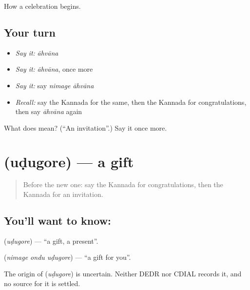 \begin{grammarlens}[title={What you've built}]
How a celebration begins.
\end{grammarlens}

\subsection*{Your turn}
\begin{itemize}
\raggedright
  \item \emph{Say it:} \emph{āhvāna}
  \item \emph{Say it:} \emph{āhvāna}, once more
  \item \emph{Say it:} say \emph{nimage āhvāna}
  \item \emph{Recall:} say the Kannada for the same, then the Kannada for congratulations, then say \emph{āhvāna} again
\end{itemize}

\begin{tcolorbox}[breakable,colback=teal!4,colframe=teal!35!black,title={Before you move on}]
What does  mean? (\textquotedblleft{}An invitation\textquotedblright{}.) Say it once more.
\end{tcolorbox}
\section[\texorpdfstring{\kn{ಉಡುಗೊರೆ} (uḍugore)}{ಉಡುಗೊರೆ (uḍugore)}]{ (uḍugore) — a gift}

\label{lesson:KA-C88-gift}



\begin{quote}
Before the new one: say the Kannada for congratulations, then the Kannada for an invitation.
\end{quote}

\subsection*{You'll want to know: }
\textbf{} (\emph{uḍugore}) — \textquotedblleft{}a gift, a present\textquotedblright{}.

\textbf{  } (\emph{nimage ondu uḍugore}) — \textquotedblleft{}a gift for you\textquotedblright{}.

\begin{cousinweb}
The origin of \textbf{} (\emph{uḍugore}) is uncertain. Neither DEDR nor CDIAL records it, and no source for it is settled.
\end{cousinweb}

